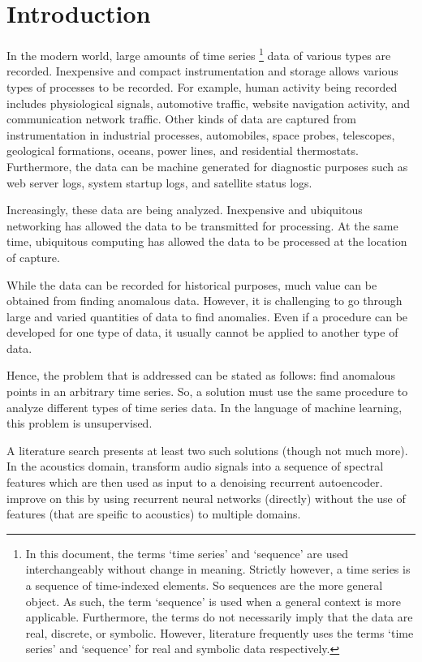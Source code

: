 \chapter[intro]{Introduction}


In the modern world, large amounts of time series \footnote{In this document, the terms `time series' and `sequence' are used interchangeably without change in meaning. Strictly however, a time series is a sequence of time-indexed elements. So sequences are the more general object. As such, the term `sequence' is used when a general context is more applicable. Furthermore, the terms do not necessarily imply that the data are real, discrete, or symbolic. However, literature frequently uses the terms `time series' and `sequence' for real and symbolic data respectively.} data of various types are recorded.  Inexpensive and compact instrumentation and storage allows various types of processes to be recorded. For example, human activity being recorded includes physiological signals, automotive traffic, website navigation activity, and communication network traffic. Other kinds of data are captured from instrumentation in industrial processes, automobiles, space probes, telescopes, geological formations, oceans, power lines, and residential thermostats. Furthermore, the data can be machine generated for diagnostic purposes such as web server logs, system startup logs, and satellite status logs.

Increasingly, these data are being analyzed. Inexpensive and ubiquitous networking has allowed the data to be transmitted for processing. At the same time, ubiquitous computing has allowed the data to be processed at the location of capture.

While the data can be recorded for historical purposes, much value can be obtained from finding anomalous data. However, it is challenging to go through large and varied quantities of data to find anomalies. Even if a procedure can be developed for one type of data, it usually cannot be applied to another type of data.

Hence, the problem that is addressed can be stated as follows: find anomalous points in an arbitrary time series. So, a solution must use the same procedure to analyze different types of time series data. In the language of machine learning, this problem is unsupervised.

A literature search presents at least two such solutions (though not much more). In the acoustics domain, \cite{Marchi2015} transform audio signals into a sequence of spectral features which are then used as input to a denoising recurrent autoencoder. \cite{Malhotra2015} improve on this by using recurrent neural networks (directly) without the use of features (that are speific to acoustics) to multiple domains.

